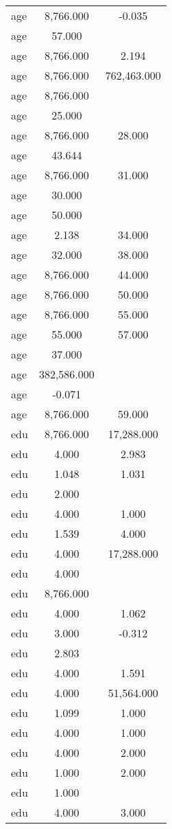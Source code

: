 \documentclass[]{article}
\begin{document}
\begin{tabular}{lcc}
age & 8,766.000 & -0.035 \\
age & 57.000 &  \\
age & 8,766.000 & 2.194 \\
age & 8,766.000 & 762,463.000 \\
age & 8,766.000 &  \\
age & 25.000 &  \\
age & 8,766.000 & 28.000 \\
age & 43.644 &  \\
age & 8,766.000 & 31.000 \\
age & 30.000 &  \\
age & 50.000 &  \\
age & 2.138 & 34.000 \\
age & 32.000 & 38.000 \\
age & 8,766.000 & 44.000 \\
age & 8,766.000 & 50.000 \\
age & 8,766.000 & 55.000 \\
age & 55.000 & 57.000 \\
age & 37.000 &  \\
age & 382,586.000 &  \\
age & -0.071 &  \\
age & 8,766.000 & 59.000 \\
edu & 8,766.000 & 17,288.000 \\
edu & 4.000 & 2.983 \\
edu & 1.048 & 1.031 \\
edu & 2.000 &  \\
edu & 4.000 & 1.000 \\
edu & 1.539 & 4.000 \\
edu & 4.000 & 17,288.000 \\
edu & 4.000 &  \\
edu & 8,766.000 &  \\
edu & 4.000 & 1.062 \\
edu & 3.000 & -0.312 \\
edu & 2.803 &  \\
edu & 4.000 & 1.591 \\
edu & 4.000 & 51,564.000 \\
edu & 1.099 & 1.000 \\
edu & 4.000 & 1.000 \\
edu & 4.000 & 2.000 \\
edu & 1.000 & 2.000 \\
edu & 1.000 &  \\
edu & 4.000 & 3.000 \\

\end{tabular}
\end{document}
